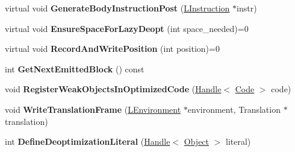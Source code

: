\begin{DoxyCompactItemize}
\item 
virtual void {\bfseries Generate\+Body\+Instruction\+Post} (\hyperlink{classv8_1_1internal_1_1_l_instruction}{L\+Instruction} $\ast$instr)\hypertarget{classv8_1_1internal_1_1_b_a_s_e___e_m_b_e_d_d_e_d_a8fd765745d5f27b43ff38bb2387123fb}{}\label{classv8_1_1internal_1_1_b_a_s_e___e_m_b_e_d_d_e_d_a8fd765745d5f27b43ff38bb2387123fb}

\item 
virtual void {\bfseries Ensure\+Space\+For\+Lazy\+Deopt} (int space\+\_\+needed)=0\hypertarget{classv8_1_1internal_1_1_b_a_s_e___e_m_b_e_d_d_e_d_af1fb95c2739c46bd177baf5f6418c6c6}{}\label{classv8_1_1internal_1_1_b_a_s_e___e_m_b_e_d_d_e_d_af1fb95c2739c46bd177baf5f6418c6c6}

\item 
virtual void {\bfseries Record\+And\+Write\+Position} (int position)=0\hypertarget{classv8_1_1internal_1_1_b_a_s_e___e_m_b_e_d_d_e_d_a0c5bc9bdc31334ea82037a71ac68fbd0}{}\label{classv8_1_1internal_1_1_b_a_s_e___e_m_b_e_d_d_e_d_a0c5bc9bdc31334ea82037a71ac68fbd0}

\item 
int {\bfseries Get\+Next\+Emitted\+Block} () const \hypertarget{classv8_1_1internal_1_1_b_a_s_e___e_m_b_e_d_d_e_d_a3347a45749213ec39452cc8097e77b63}{}\label{classv8_1_1internal_1_1_b_a_s_e___e_m_b_e_d_d_e_d_a3347a45749213ec39452cc8097e77b63}

\item 
void {\bfseries Register\+Weak\+Objects\+In\+Optimized\+Code} (\hyperlink{classv8_1_1internal_1_1_handle}{Handle}$<$ \hyperlink{classv8_1_1internal_1_1_code}{Code} $>$ code)\hypertarget{classv8_1_1internal_1_1_b_a_s_e___e_m_b_e_d_d_e_d_aa558fa2dd57c999442aa6370098efb39}{}\label{classv8_1_1internal_1_1_b_a_s_e___e_m_b_e_d_d_e_d_aa558fa2dd57c999442aa6370098efb39}

\item 
void {\bfseries Write\+Translation\+Frame} (\hyperlink{classv8_1_1internal_1_1_l_environment}{L\+Environment} $\ast$environment, Translation $\ast$translation)\hypertarget{classv8_1_1internal_1_1_b_a_s_e___e_m_b_e_d_d_e_d_a07b9d7215f9fdb5b822e3ff5bbb00f7b}{}\label{classv8_1_1internal_1_1_b_a_s_e___e_m_b_e_d_d_e_d_a07b9d7215f9fdb5b822e3ff5bbb00f7b}

\item 
int {\bfseries Define\+Deoptimization\+Literal} (\hyperlink{classv8_1_1internal_1_1_handle}{Handle}$<$ \hyperlink{classv8_1_1internal_1_1_object}{Object} $>$ literal)\hypertarget{classv8_1_1internal_1_1_b_a_s_e___e_m_b_e_d_d_e_d_a31b4648bfa8a9ff10ac632f821a65a39}{}\label{classv8_1_1internal_1_1_b_a_s_e___e_m_b_e_d_d_e_d_a31b4648bfa8a9ff10ac632f821a65a39}


\end{DoxyCompactItemize}
